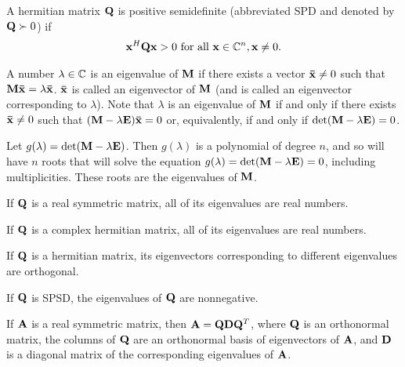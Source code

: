 \begin{definition}{}{}
    A hermitian matrix $\bold{Q}$ is positive semidefinite (abbreviated SPD and denoted by $\bold{Q}\succ 0$) if 
    \begin{align*}
        \bold{x}^H\bold{Q}\bold{x}> 0 \text{ for all } \bold{x}\in \mathbb{C}^n, \bold{x}\neq 0.
    \end{align*}
\end{definition}

A number $\lambda\in\mathbb{C}$ is an eigenvalue of $\bold{M}$ if there exists 
a vector $\bold{\bar{x}}\neq 0$ such that $\bold{M}\bold{\bar{x}}=\lambda \bold{\bar{x}}$.
$\bold{\bar{x}}$ is called an eigenvector of $\bold{M}$ (and is called an eigenvector corresponding to $\lambda$).
Note that $\lambda$ is an eigenvalue of $\bold{M}$ if and only if there exists $\bold{\bar{x}}\neq 0$ such that 
$(\bold{M}-\lambda \bold{E})\bold{\bar{x}}=0$ or, equivalently, if and only if $\text{det}(\bold{M}-\lambda \bold{E})=0$.

Let $g(\lambda)=\text{det}(\bold{M}-\lambda \bold{E})$. Then $g(\lambda)$ is 
a polynomial of degree $n$, and so will have $n$ roots 
that will solve the equation $g(\lambda)=\text{det}(\bold{M}-\lambda \bold{E})=0$, 
including multiplicities. These roots are the eigenvalues of $\bold{M}$.


\begin{proposition}{}{}
    If $\bold{Q}$ is a real symmetric matrix, all of its eigenvalues are real numbers.
\end{proposition}

\begin{proposition}{}{}
    If $\bold{Q}$ is a complex hermitian matrix, all of its eigenvalues are real numbers.
\end{proposition}

\begin{proposition}{}{}
    If $\bold{Q}$ is a hermitian matrix, 
    its eigenvectors corresponding to different eigenvalues are orthogonal.
\end{proposition}

\begin{proposition}{}{}
    If $\bold{Q}$ is SPSD, the eigenvalues of $\bold{Q}$ are nonnegative.
\end{proposition}

\begin{theorem}{}{}
    If $\bold{A}$ is a real symmetric matrix, then $\bold{A}=\bold{Q}\bold{D}\bold{Q}^T$,
    where $\bold{Q}$ is an orthonormal matrix, the columns of $\bold{Q}$ are an orthonormal basis of eigenvectors of $\bold{A}$,
    and $\bold{D}$ is a diagonal matrix of the corresponding eigenvalues of $\bold{A}$.
\end{theorem}

